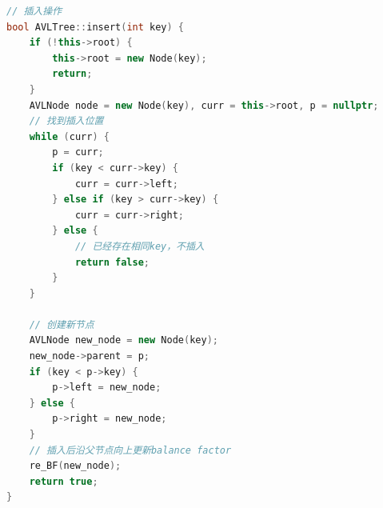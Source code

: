 \documentclass[a4paper, 12pt, oneside]{article}
\theoremstyle{cn_theorem}
\begin{document}
\begin{lstlisting}[language=c++]
// 插入操作
bool AVLTree::insert(int key) {
    if (!this->root) {
        this->root = new Node(key);
        return;
    }
    AVLNode node = new Node(key), curr = this->root, p = nullptr;
    // 找到插入位置
    while (curr) {
        p = curr;
        if (key < curr->key) {
            curr = curr->left;
        } else if (key > curr->key) {
            curr = curr->right;
        } else {
            // 已经存在相同key，不插入
            return false;
        }
    }

    // 创建新节点
    AVLNode new_node = new Node(key);
    new_node->parent = p;
    if (key < p->key) {
        p->left = new_node;
    } else {
        p->right = new_node;
    }
    // 插入后沿父节点向上更新balance factor
    re_BF(new_node);
    return true;
}

\end{lstlisting}
\end{document}
